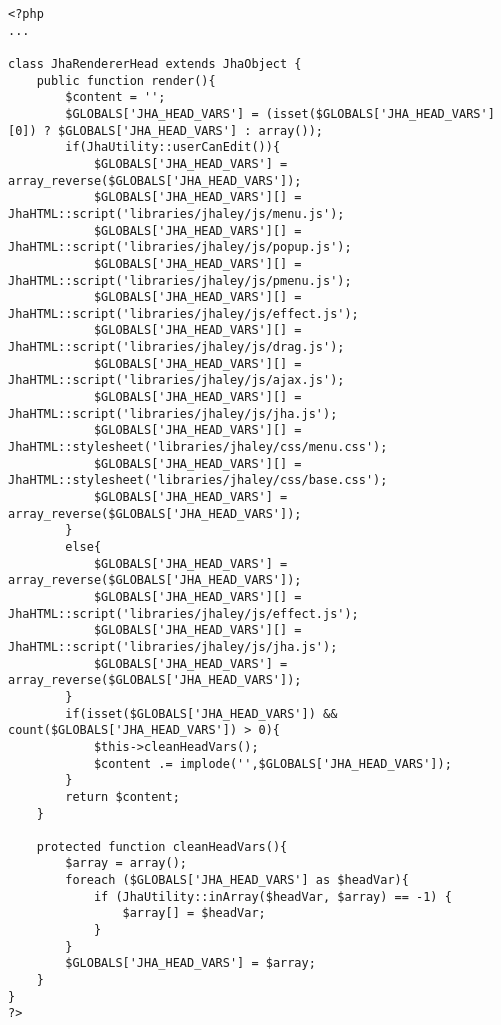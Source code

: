 \begin{lstlisting}[label=jha_renderer_head,caption=Renderizador para el tag HTML `head'.]
<?php
...

class JhaRendererHead extends JhaObject {
    public function render(){
        $content = '';
        $GLOBALS['JHA_HEAD_VARS'] = (isset($GLOBALS['JHA_HEAD_VARS'][0]) ? $GLOBALS['JHA_HEAD_VARS'] : array());
        if(JhaUtility::userCanEdit()){
        	$GLOBALS['JHA_HEAD_VARS'] = array_reverse($GLOBALS['JHA_HEAD_VARS']);
        	$GLOBALS['JHA_HEAD_VARS'][] = JhaHTML::script('libraries/jhaley/js/menu.js');
        	$GLOBALS['JHA_HEAD_VARS'][] = JhaHTML::script('libraries/jhaley/js/popup.js');
        	$GLOBALS['JHA_HEAD_VARS'][] = JhaHTML::script('libraries/jhaley/js/pmenu.js');
        	$GLOBALS['JHA_HEAD_VARS'][] = JhaHTML::script('libraries/jhaley/js/effect.js');
        	$GLOBALS['JHA_HEAD_VARS'][] = JhaHTML::script('libraries/jhaley/js/drag.js');
        	$GLOBALS['JHA_HEAD_VARS'][] = JhaHTML::script('libraries/jhaley/js/ajax.js');
	        $GLOBALS['JHA_HEAD_VARS'][] = JhaHTML::script('libraries/jhaley/js/jha.js');
	        $GLOBALS['JHA_HEAD_VARS'][] = JhaHTML::stylesheet('libraries/jhaley/css/menu.css');
	        $GLOBALS['JHA_HEAD_VARS'][] = JhaHTML::stylesheet('libraries/jhaley/css/base.css');
	        $GLOBALS['JHA_HEAD_VARS'] = array_reverse($GLOBALS['JHA_HEAD_VARS']);
        }
        else{
        	$GLOBALS['JHA_HEAD_VARS'] = array_reverse($GLOBALS['JHA_HEAD_VARS']);
        	$GLOBALS['JHA_HEAD_VARS'][] = JhaHTML::script('libraries/jhaley/js/effect.js');
	        $GLOBALS['JHA_HEAD_VARS'][] = JhaHTML::script('libraries/jhaley/js/jha.js');
	        $GLOBALS['JHA_HEAD_VARS'] = array_reverse($GLOBALS['JHA_HEAD_VARS']);
        }
        if(isset($GLOBALS['JHA_HEAD_VARS']) && count($GLOBALS['JHA_HEAD_VARS']) > 0){
        	$this->cleanHeadVars();
            $content .= implode('',$GLOBALS['JHA_HEAD_VARS']);
        }
        return $content;
    }
    
    protected function cleanHeadVars(){
    	$array = array();
    	foreach ($GLOBALS['JHA_HEAD_VARS'] as $headVar){
    		if (JhaUtility::inArray($headVar, $array) == -1) {
    			$array[] = $headVar;
    		}
    	}
    	$GLOBALS['JHA_HEAD_VARS'] = $array;
    }
}
?>
\end{lstlisting}
